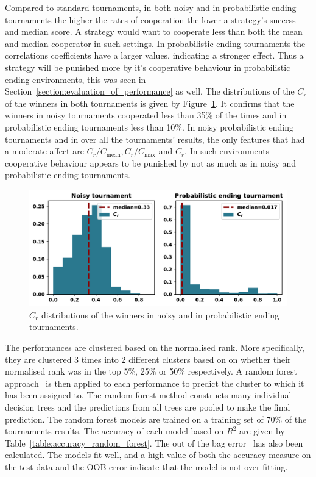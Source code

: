 \documentclass{article}
\begin{document}
Compared to standard tournaments, in both noisy and in probabilistic ending
tournaments the higher the rates of cooperation the lower a strategy's success
and median score. A strategy would want to cooperate less than both
the mean and median cooperator in such settings. In probabilistic ending
tournaments the correlations coefficients have a larger values, indicating a
stronger effect. Thus a strategy will be punished more by it's cooperative
behaviour in probabilistic ending environments, this was seen in Section~\ref{section:evaluation_of_performance}
as well. The distributions of the $C_r$ of the winners in
both tournaments is given by Figure~\ref{fig:c_r_distributions}. It confirms
that the winners in noisy tournaments cooperated less than 35\% of the times
and in probabilistic ending tournaments less than 10\%.
In noisy probabilistic ending tournaments and in over all the tournaments' results,
the only features that had a moderate affect are $C_r/C_{\text{mean}},
C_r/C_{\text{max}}$ and $C_r$. In such environments cooperative behaviour
appears to be punished by not as much as in noisy and probabilistic ending
tournaments.

\begin{figure}[!htbp]
    \centering
    \includegraphics[width=.65\textwidth]{../images/c_r_winners_tournaments.pdf}
    \caption{$C_r$ distributions of the winners in noisy and in probabilistic
    ending tournaments.}\label{fig:c_r_distributions}
\end{figure}

The performances are clustered based on the normalised rank. More specifically,
they are clustered 3 times into 2 different clusters based on  on whether their
normalised rank was in the top 5\%, 25\% or 50\% respectively. A random forest
approach~\cite{breiman2001} is then applied to each performance to predict the cluster to
which it has been assigned to. The random forest method
constructs many individual decision trees and the predictions from all trees are
pooled to make the final prediction. The random forest models are trained on a
training set of 70\% of the tournaments results. The accuracy of each model
based on $R^2$ are given by Table~\ref{table:accuracy_random_forest}. The out of
the bag error~\cite{hastie2005} has also been calculated. The models fit well,
and a high value of both the accuracy measure on the test data and the OOB error
indicate that the model is not over fitting.
\end{document}
